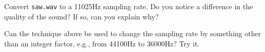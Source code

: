 \begin{problem} %
Convert \texttt{saw.wav} to a 11025Hz sampling rate. Do you notice a difference in the quality of the sound? If so, can you explain why?
\end{problem}

\begin{problem} %
Can the technique above be used to change the sampling rate by something other than an integer factor, e.g., from 44100Hz to 36000Hz? Try it.
\end{problem}

\let\undefined\x
\let\undefined\q
\let\undefined\p
\let\undefined\v